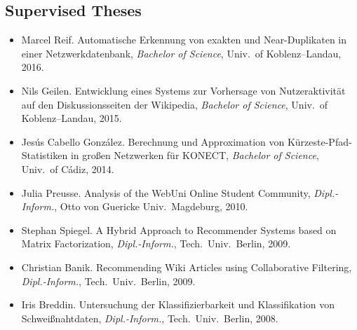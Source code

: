 \documentclass[line,mm]{res}
\newcounter{x}
\newcounter{y}
\begin{document}
\begin{resume}
\section{Supervised Theses}
\begin{itemize}
\item 
  Marcel Reif.  Automatische Erkennung von exakten und
  Near-Duplikaten in einer Netzwerkdatenbank, \emph{Bachelor of
    Science}, Univ.\ of Koblenz--Landau, 2016.
\item 
  Nils Geilen.  Entwicklung eines Systems zur Vorhersage von
  Nutzeraktivität auf den Diskussionsseiten der Wikipedia,
  \emph{Bachelor of Science}, Univ.\ of Koblenz--Landau, 2015.
\item
  Jesús Cabello González.  Berechnung und Approximation von
  Kürzeste-Pfad-Statistiken in großen Netzwerken für KONECT,
  \emph{Bachelor of Science}, Univ.\ of Cádiz, 2014. 
\item
  Julia Preusse. Analysis of the WebUni Online Student Community,
  \emph{Dipl.-Inform.}, Otto von Guericke Univ.\ Magdeburg, 2010.  
\item
  Stephan Spiegel.  A Hybrid Approach to Recommender Systems based
  on Matrix Factorization, \emph{Dipl.-Inform.}, Tech.\ Univ.\ Berlin, 2009.  
\item
  Christian Banik.  Recommending Wiki Articles using Collaborative
  Filtering, \emph{Dipl.-Inform.}, Tech.\ Univ.\ Berlin, 2009. 
\item
  Iris Breddin.  Untersuchung der Klassifizierbarkeit und
  Klassifikation von Schweißnahtdaten, \emph{Dipl.-Inform.}, Tech.\ Univ.\ Berlin, 2008.
\end{itemize}


\end{resume}
\end{document}
